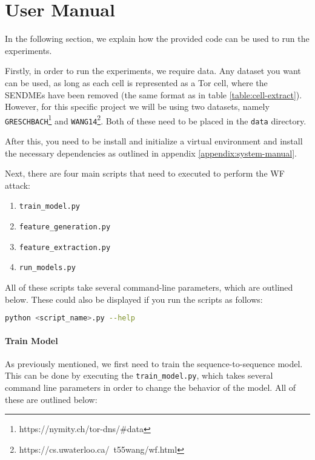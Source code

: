 \chapter{User Manual}

\begingroup

\renewcommand{\thesubsection}{\arabic{subsection}}

\renewcommand{\addcontentsline}[3]{}%

In the following section, we explain how the provided code can be used to run the experiments.

Firstly, in order to run the experiments, we require data.
Any dataset you want can be used, as long as each cell is represented as a Tor cell, where the SENDMEs have been removed (the same format as in table \ref{table:cell-extract}).
However, for this specific project we will be using two datasets, namely \texttt{GRESCHBACH}\footnote{https://nymity.ch/tor-dns/\#data} and \texttt{WANG14}\footnote{https://cs.uwaterloo.ca/~t55wang/wf.html}.
Both of these need to be placed in the \texttt{data} directory.

After this, you need to be install and initialize a virtual environment and install the necessary dependencies as outlined in appendix \ref{appendix:system-manual}.

Next, there are four main scripts that need to executed to perform the WF attack:
\begin{enumerate}
  \item \texttt{train\_model.py}
  \item \texttt{feature\_generation.py}
  \item \texttt{feature\_extraction.py}
  \item \texttt{run\_models.py}
\end{enumerate}

All of these scripts take several command-line parameters, which are outlined below.
These could also be displayed if you run the scripts as follows:
\begin{lstlisting}[language=Bash]
python <script_name>.py --help
\end{lstlisting}

\subsubsection{Train Model}

As previously mentioned, we first need to train the sequence-to-sequence model.
This can be done by executing the \texttt{train\_model.py}, which takes several command line parameters in order to change the behavior of the model.
All of these are outlined below:

